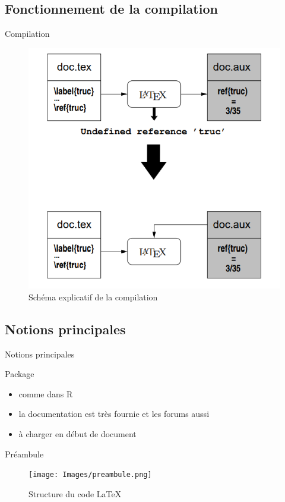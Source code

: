 \documentclass[8pt]{beamer}\usepackage[]{graphicx}\usepackage[]{xcolor}
\begin{document}
\subsection{Fonctionnement de la compilation}
	\begin{frame}{Compilation}
	\begin{figure}[h!]
  \caption{Schéma explicatif de la compilation}
  \label{compilation}
  \centering
  \includegraphics[scale=0.4]{Images/compilation.png}
\end{figure}
	\end{frame}

\subsection{Notions principales}
	\begin{frame}{Notions principales}
	 \begin{block}{Package}
	  \begin{itemize}
    \item comme dans R
    \item la documentation est très fournie et les forums aussi
    \item à charger en début de document
    \end{itemize}
	  \end{block}
	  
	 \begin{block}{Préambule}
	\begin{figure}[h!]
  \caption{Structure du code \LaTeX}
  \label{preambule}
  \centering
  \texttt{[image: Images/preambule.png]}
\end{figure}
	  \end{block}
	 
	\end{frame}
	
\end{document}
